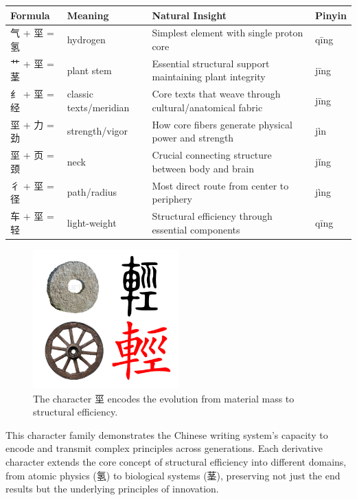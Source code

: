 \documentclass[11pt,letterpaper]{article}
\begin{document}
\begin{longtable}{|p{3cm}|p{3cm}|p{6cm}|p{2cm}|}
\hline
\textbf{Formula} & \textbf{Meaning} & \textbf{Natural Insight} & \textbf{Pinyin} \\
\hline
气 + 坙 = 氢 & hydrogen & Simplest element with single proton core & qīng \\
\hline
艹 + 坙 = 茎 & plant stem & Essential structural support maintaining plant integrity & jīng \\
\hline
纟 + 坙 = 经 & classic texts/meridian & Core texts that weave through cultural/anatomical fabric & jīng \\
\hline
坙 + 力 = 劲 & strength/vigor & How core fibers generate physical power and strength & jìn \\
\hline
坙 + 页 = 颈 & neck & Crucial connecting structure between body and brain & jǐng \\
\hline
彳 + 坙 = 径 & path/radius & Most direct route from center to periphery & jìng \\
\hline
车 + 坙 = 轻 & light-weight & Structural efficiency through essential components & qīng \\
\hline
\end{longtable}

\begin{figure}
\centering
\includegraphics[width=0.5\textwidth]{./images/zi_stem.png}
\caption{The character 坙 encodes the evolution from material mass to
structural efficiency.}
\end{figure}

This character family demonstrates the Chinese writing system's capacity
to encode and transmit complex principles across generations. Each
derivative character extends the core concept of structural efficiency
into different domains, from atomic physics (氢) to biological systems
(茎), preserving not just the end results but the underlying principles
of innovation.
\end{document}
